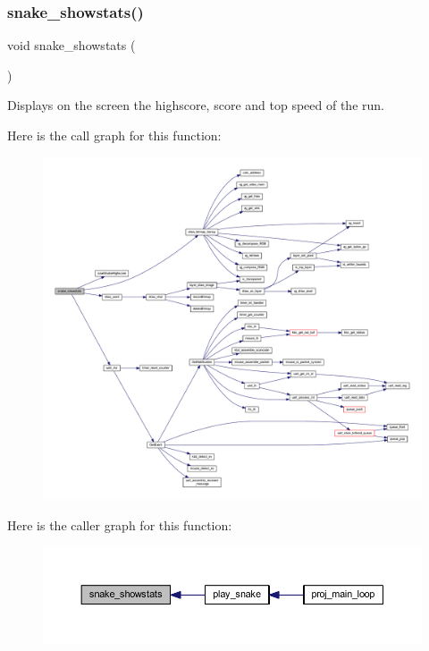 \subsubsection{\texorpdfstring{snake\+\_\+showstats()}{snake\_showstats()}}
{\footnotesize\ttfamily void snake\+\_\+showstats (\begin{DoxyParamCaption}{ }\end{DoxyParamCaption})}



Displays on the screen the highscore, score and top speed of the run. 

Here is the call graph for this function\+:
\nopagebreak
\begin{figure}[H]
\begin{center}
\leavevmode
\includegraphics[width=350pt]{group__snake_ga856dc5c649341abaee91d35bafaa92b9_cgraph}
\end{center}
\end{figure}
Here is the caller graph for this function\+:\nopagebreak
\begin{figure}[H]
\begin{center}
\leavevmode
\includegraphics[width=350pt]{group__snake_ga856dc5c649341abaee91d35bafaa92b9_icgraph}
\end{center}
\end{figure}
\mbox{\label{group__snake_ga170531808ef1c4ac7d2481cd4278da99}} 
